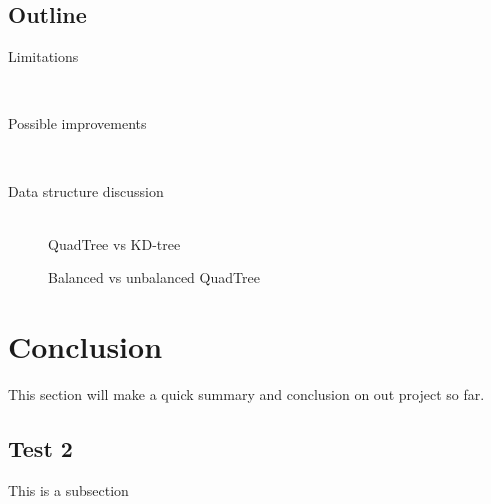 \documentclass[a4paper,11pt]{article}
\begin{document}
\subsection{Outline}
\begin{description}
	\item[Limitations] \hfill \\
	
	\item[Possible improvements] \hfill \\
	
	\item[Data structure discussion] \hfill \\
	QuadTree vs KD-tree
	
	Balanced vs unbalanced QuadTree
\end{description}

\pagebreak
\section{Conclusion} %
\label{sec:Conclusion}
This section will make a quick summary and conclusion on out project so far.

\subsection{Test 2}

This is a subsection
\end{document}
